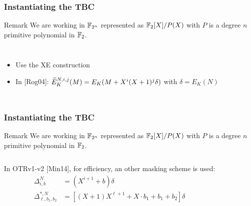 \documentclass{beamer}
\begin{document}
	\begin{frame}
		\frametitle{Instantiating the TBC}

		\begin{alertblock}{Remark}
			We are working in $\F_{2^n}$ represented as $\F_2[X]/P(X)$ with $P$ is a degree $n$ primitive polynomial in $\F_2$.
		\end{alertblock}

	    \begin{columns}
	\begin{itemize}
		\item Use the XE construction
	
		\item In {[Rog04]}: $\tE^{N,i,j}_{K}(M) = E_K(M + X^i (X+1)^j \delta)$ with $\delta = E_K(N)$
		
		
	\end{itemize}
					\begin{tikzpicture}[
						scale=1,
						node distance=1.8cm,
						line width = 0.5pt,
					]
						
					\end{tikzpicture}
		\end{columns}
	\end{frame}

	\begin{frame}
		\frametitle{Instantiating the TBC}

		\begin{alertblock}{Remark}
			We are working in $\F_{2^n}$ represented as $\F_2[X]/P(X)$ with $P$ is a degree $n$ primitive polynomial in $\F_2$.
		\end{alertblock}

	    \begin{columns}
	     \column{.8\textwidth}
		 
		 In OTRv1-v2 {[Min14]}, for efficiency, an other masking scheme is used:
		 \begin{align*}
   		 	\Delta^{N}_{i,b} &= (X^{i+1} + b) \delta \\
   		 	\Delta^{*,N}_{\ell,b_1,b_2} &= [(X+1)X^{\ell+1} + X\cdot b_1 +b_1 +b_2]\delta \\
		 \end{align*}

	     \column{.2\textwidth}
					\begin{tikzpicture}[
						scale=1,
						node distance=1.8cm,
						line width = 0.5pt,
					]
						
					\end{tikzpicture}
		\end{columns}
	\end{frame}
\end{document}
